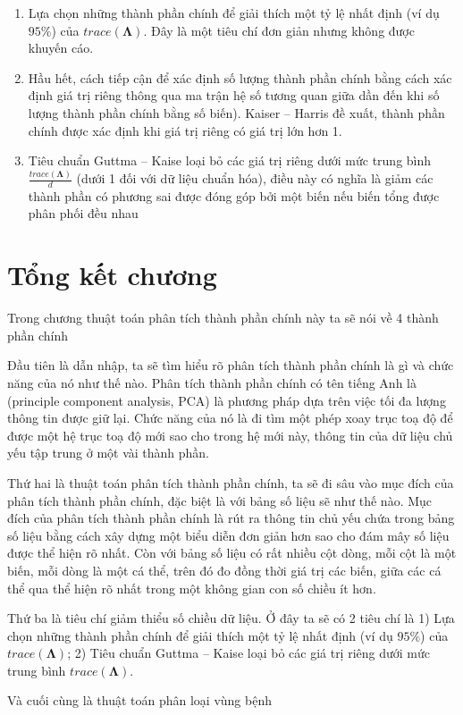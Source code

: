 \documentclass[../thesis.tex]{subfiles}
\begin{document}
\begin{enumerate}
	\item Lựa chọn những thành phần chính để giải thích một tỷ lệ nhất định (ví dụ $ 95\% $) của $ trace(\bm{\Lambda}) $. Đây là một tiêu chí đơn giản nhưng không được khuyến cáo.
	\item Hầu hết, cách tiếp cận để xác định số lượng thành phần chính bằng cách xác định giá trị riêng thông qua ma trận hệ số tương quan giữa dần đến khi số lượng thành phần chính bằng số biến). Kaiser -- Harris đề xuất, thành phần chính được xác định khi giá trị riêng có giá trị lớn hơn 1.
	\item Tiêu chuẩn Guttma -- Kaise loại bỏ các giá trị riêng dưới mức trung bình $ \tfrac{trace(\bm{\Lambda})}{d} $ (dưới 1 đối với dữ liệu chuẩn hóa), điều này có nghĩa là giảm các thành phần có phương sai được đóng góp bởi một biến nếu biến tổng được phân phối đều nhau
\end{enumerate}

\newpage
\section*{Tổng kết chương}

Trong chương thuật toán phân tích thành phần chính này ta sẽ nói về 4 thành phần chính

Đầu tiên là dẫn nhập, ta sẽ tìm hiểu rõ phân tích thành phần chính là gì và chức năng của nó như thế nào. Phân tích thành phần chính có tên tiếng Anh là (principle component analysis, PCA) là phương pháp dựa trên việc tối đa
lượng thông tin được giữ lại. Chức năng của nó là đi tìm một phép xoay trục toạ độ để được một hệ trục toạ độ mới sao cho trong hệ mới này, thông tin của dữ liệu chủ yếu tập trung ở một vài thành phần. 

Thứ hai là thuật toán phân tích thành phần chính, ta sẽ đi sâu vào mục đích của phân tích thành phần chính, đặc biệt là với bảng số liệu sẽ như thế nào. Mục đích của phân tích thành phần chính là rút ra thông tin chủ yếu chứa trong bảng số liệu bằng cách xây dựng một biểu diễn đơn giản hơn sao cho đám mây số liệu được thể hiện rõ nhất. Còn với bảng số liệu có rất nhiều cột dòng, mỗi cột là một biến, mỗi dòng là một cá thể, trên đó đo đồng thời giá trị các biến, giữa các cá thể qua thể hiện rõ nhất trong một không gian con số chiều ít hơn.

Thứ ba là tiêu chí giảm thiểu số chiều dữ liệu. Ở đây ta sẽ có 2 tiêu chí là 1) Lựa chọn những thành phần chính để giải thích một tỷ lệ nhất định (ví dụ $ 95\% $) của $ trace(\bm{\Lambda}) $; 2)  Tiêu chuẩn Guttma – Kaise loại bỏ các giá trị riêng dưới mức trung bình $ trace(\bm{\Lambda}) $.

Và cuối cùng là thuật toán phân loại vùng bệnh
\end{document}
